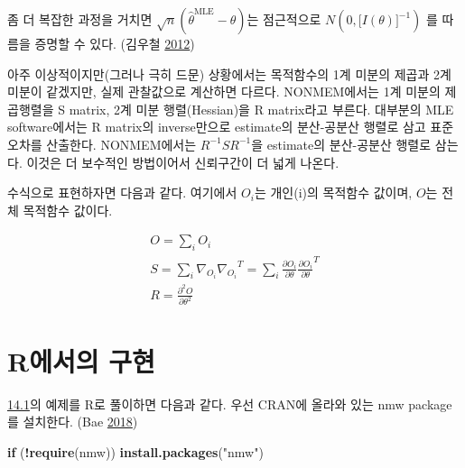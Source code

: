 \documentclass[
  10pt,
  krantz2,
  a4paper]{krantz}
\newenvironment{Shaded}{\begin{snugshade}}{\end{snugshade}}
\newcommand{\ControlFlowTok}[1]{\textcolor[rgb]{0.13,0.29,0.53}{\textbf{#1}}}
\newcommand{\KeywordTok}[1]{\textcolor[rgb]{0.13,0.29,0.53}{\textbf{#1}}}
\newcommand{\NormalTok}[1]{#1}
\newcommand{\OperatorTok}[1]{\textcolor[rgb]{0.81,0.36,0.00}{\textbf{#1}}}
\newcommand{\StringTok}[1]{\textcolor[rgb]{0.31,0.60,0.02}{#1}}
\newenvironment{Shaded}{\begin{snugshade}}{\end{snugshade}}
\theoremstyle{definition}
\theoremstyle{definition}
\theoremstyle{definition}
\theoremstyle{remark}
\begin{document}
좀 더 복잡한 과정을 거치면 \(\sqrt{n}({\widehat{\theta}}^{\text{MLE}} - \theta)\)는 점근적으로 \(N(0,\lbrack I(\theta)\rbrack^{- 1})\) 를 따름을 증명할 수 있다. (김우철 \protect\hyperlink{ref-kim}{2012})

아주 이상적이지만(그러나 극히 드문) 상황에서는 목적함수의 1계 미분의 제곱과 2계 미분이 같겠지만, 실제 관찰값으로 계산하면
다르다. NONMEM에서는 1계 미분의 제곱행렬을 S matrix, 2계 미분 행렬(Hessian)을 R matrix라고
부른다. 대부분의 MLE software에서는 R matrix의 inverse만으로 estimate의 분산-공분산 행렬로 삼고
표준오차를 산출한다. NONMEM에서는 \(R^{- 1}SR^{- 1}\)을 estimate의 분산-공분산 행렬로 삼는다. 이것은
더 보수적인 방법이어서 신뢰구간이 더 넓게 나온다.

수식으로 표현하자면 다음과 같다. 여기에서 \(O_{i}\)는 개인(i)의 목적함수 값이며, \(O\)는 전체 목적함수 값이다.

\begin{equation}
\begin{split}
O = \sum_{i}^{}O_{i} \\
S = \sum_{i}^{}{\nabla_{O_{i}}{\nabla_{O_{i}}}^{T}} = \sum_{i}^{}\frac{\partial O_{i}}{\partial\theta}\frac{\partial O_{i}}{\partial\theta}^{T} \\
R = \frac{\partial^{2}O}{\partial\theta^{2}}
\end{split}
\label{eq:o-s-r}
\end{equation}

\hypertarget{ruxc5d0uxc11cuxc758-uxad6cuxd604}{%
\section{R에서의 구현}\label{ruxc5d0uxc11cuxc758-uxad6cuxd604}}

\protect\hyperlink{actual-example}{14.1}의 예제를 R로 풀이하면 다음과 같다. 우선 CRAN에 올라와 있는 nmw package를 설치한다. (Bae \protect\hyperlink{ref-R-nmw}{2018})

\begin{Shaded}
\begin{Highlighting}[]
\ControlFlowTok{if}\NormalTok{ (}\OperatorTok{!}\KeywordTok{require}\NormalTok{(nmw)) }\KeywordTok{install.packages}\NormalTok{(}\StringTok{"nmw"}\NormalTok{)}
\end{Highlighting}
\end{Shaded}
\end{document}
